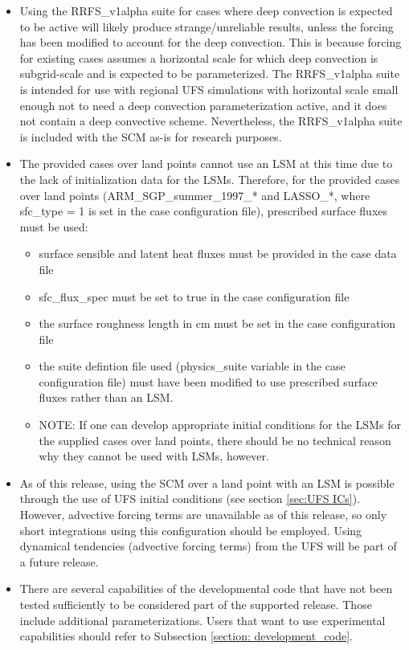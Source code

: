\begin{itemize}
\item Using the RRFS\_v1alpha suite for cases where deep convection is expected to be active will likely produce strange/unreliable results, unless the forcing has been modified to account for the deep convection. This is because forcing for existing cases assumes a horizontal scale for which deep convection is subgrid-scale and is expected to be parameterized. The RRFS\_v1alpha suite is intended for use with regional UFS simulations with horizontal scale small enough not to need a deep convection parameterization active, and it does not contain a deep convective scheme. Nevertheless, the RRFS\_v1alpha suite is included with the SCM as-is for research purposes.
\item The provided cases over land points cannot use an LSM at this time due to the lack of initialization data for the LSMs. Therefore, for the provided cases over land points (ARM\_SGP\_summer\_1997\_* and LASSO\_*, where sfc\_type = 1 is set in the case configuration file), prescribed surface fluxes must be used:
\begin{itemize}
\item surface sensible and latent heat fluxes must be provided in the case data file
\item sfc\_flux\_spec must be set to true in the case configuration file
\item the surface roughness length in cm must be set in the case configuration file
\item the suite defintion file used (physics\_suite variable in the case configuration file) must have been modified to use prescribed surface fluxes rather than an LSM.
\item NOTE: If one can develop appropriate initial conditions for the LSMs for the supplied cases over land points, there should be no technical reason why they cannot be used with LSMs, however.
\end{itemize}
\item As of this release, using the SCM over a land point with an LSM is possible through the use of UFS initial conditions (see section \ref{sec:UFS ICs}). However, advective forcing terms are unavailable as of this release, so only short integrations using this configuration should be employed. Using dynamical tendencies (advective forcing terms) from the UFS will be part of a future release.
\item There are several capabilities of the developmental code that have not been tested sufficiently to be considered part of the supported release. Those include additional parameterizations. Users that want to use experimental capabilities should refer to Subsection \ref{section: development_code}.
\end{itemize}
